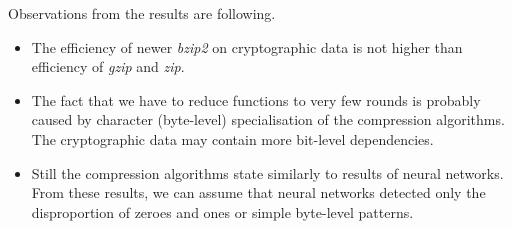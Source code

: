 \documentclass[
  print, %
  Table,   %
  nolof,     %
  nolot,     %
  11pt, %
  oneside  %
]{fithesis3}
\begin{document}


Observations from the results are following.

\begin{itemize}
    \item The efficiency of newer \textit{bzip2} on cryptographic data is not higher than efficiency of \textit{gzip} and \textit{zip}.
    \item The fact that we have to reduce functions to very few rounds is probably caused by character (byte-level) specialisation of the compression algorithms. The cryptographic data may contain more bit-level dependencies.
    \item Still the compression algorithms state similarly to results of neural networks. From these results, we can assume that neural networks detected only the disproportion of zeroes and ones or simple byte-level patterns.
\end{itemize}
\end{document}
